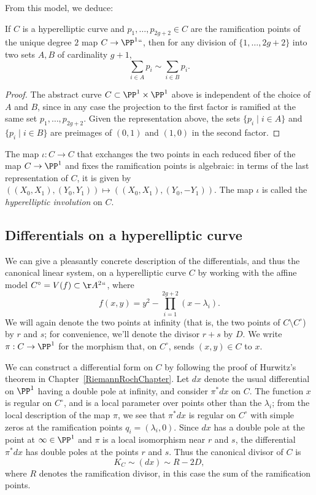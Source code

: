 From this model, we deduce:

\begin{corollary}
\label{relation on ramification points}
If $C$ is a hyperelliptic curve  and $p_1,\dots,p_{2g+2} \in C$ are the
ramification points of the unique degree $2$ map $C \to \PP^1` `$, then for any
division of $\{1,\dots,2g+2\}$ into two sets $A,B$ of cardinality $g+1$,
$$
\sum_{i\in A} p_{i}   \sim  \sum_{i\in B}p_{i}.
$$
\end{corollary}

\begin{proof}
The abstract curve $C\subset \PP^{1}\times \PP^{1}$ above
is independent of the
choice of $A$ and $B$,
since in any case the projection to the
first factor
is ramified at the same set $p_{1}, \dots, p_{2g+2}$. Given the
representation above, the sets
$\{p_i\mid i\in A\}$ and  $\{p_i\mid i\in B\}$
are
preimages of $(0,1)$ and
$(1,0)$ in the second factor.
\end{proof}

 The map $\iota : C \to C$ that exchanges the two points in each reduced
 fiber of the map $C \to \PP^1$ and fixes the ramification points is
 algebraic: in terms of the last representation of $C$, it is given by
 $((X_0,X_1), (Y_0,Y_1)) \mapsto  ((X_0,X_1), (Y_0,-Y_1)) $. The map
%
%
 $\iota$ is called the \emph{hyperelliptic involution} on $C$.

\subsection*{Differentials on a hyperelliptic curve}

We can give a pleasantly concrete \null description of the differentials,
and thus the
canonical linear system,
%
on a hyperelliptic curve $C$
by working with the affine model $C^\circ = V(f) \subset \AA^2` `$, where
$$
f(x,y) = y^2 - \prod_{i=1}^{2g+2} (x - \lambda_i).
$$
We will again denote the two points at infinity (that is, the two points
of $C \setminus C^\circ$) by $r$ and $s$; for convenience, we'll denote
the divisor $r+s$ by $D$. We write $\pi:C \to \PP^1$ for the morphism
that, on $C^\circ$, sends $(x,y) \in C$ to $x$.

We can construct a differential form on $C$ by following the proof of
Hurwitz's theorem
%
in
Chapter~\ref{RiemannRochChapter}.
Let $dx$ denote the usual differential on $\PP^1$ having a double
pole at infinity, and consider $\pi^*dx$ on $C$.  The function $x$ is
regular on $C^\circ$, and is a local parameter over points other than
the $\lambda_i$; from the local description of the map $\pi$, we see that
$\pi^*dx$ is regular on $C^\circ$  with simple zeros at the ramification
points $q_i = (\lambda_i, 0)$. Since $dx$ has a double pole at the
point at $\infty\in \PP^1$ and $\pi$ is a local isomorphism near $r$
and $s$, the differential $\pi^*dx$ has double poles at the points $r$
and $s$. Thus the canonical
divisor of $C$ is
$$
 K_C \sim (dx) \sim R - 2D,
$$
where $R$ denotes the ramification divisor, in this case the sum of the
ramification points.

